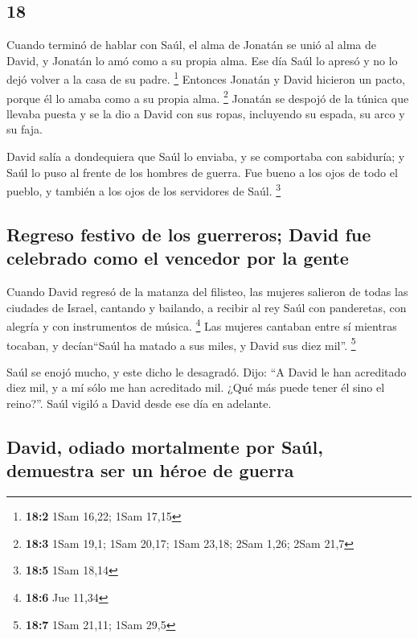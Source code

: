 \begin{paracol}{2}
\hypertarget{section-34}{%
\section{18}\label{section-34}}

 Cuando terminó de hablar con Saúl, el alma de Jonatán se
unió al alma de David, y Jonatán lo amó como a su propia alma.
 Ese día Saúl lo apresó y no lo dejó volver a la casa de
su padre. \footnote{\textbf{18:2} 1Sam 16,22; 1Sam 17,15} 
Entonces Jonatán y David hicieron un pacto, porque él lo amaba como a su
propia alma. \footnote{\textbf{18:3} 1Sam 19,1; 1Sam 20,17; 1Sam 23,18;
  2Sam 1,26; 2Sam 21,7}  Jonatán se despojó de la túnica
que llevaba puesta y se la dio a David con sus ropas, incluyendo su
espada, su arco y su faja.

 David salía a dondequiera que Saúl lo enviaba, y se
comportaba con sabiduría; y Saúl lo puso al frente de los hombres de
guerra. Fue bueno a los ojos de todo el pueblo, y también a los ojos de
los servidores de Saúl. \footnote{\textbf{18:5} 1Sam 18,14}

\hypertarget{regreso-festivo-de-los-guerreros-david-fue-celebrado-como-el-vencedor-por-la-gente}{%
\subsection{Regreso festivo de los guerreros; David fue celebrado como
el vencedor por la
gente}\label{regreso-festivo-de-los-guerreros-david-fue-celebrado-como-el-vencedor-por-la-gente}}

 Cuando David regresó de la matanza del filisteo, las
mujeres salieron de todas las ciudades de Israel, cantando y bailando, a
recibir al rey Saúl con panderetas, con alegría y con instrumentos de
música. \footnote{\textbf{18:6} Jue 11,34}  Las mujeres
cantaban entre sí mientras tocaban, y decían``Saúl ha matado a sus
miles, y David sus diez mil''. \footnote{\textbf{18:7} 1Sam 21,11; 1Sam
  29,5}

 Saúl se enojó mucho, y este dicho le desagradó. Dijo: ``A
David le han acreditado diez mil, y a mí sólo me han acreditado mil.
¿Qué más puede tener él sino el reino?''.  Saúl vigiló a
David desde ese día en adelante.

\hypertarget{david-odiado-mortalmente-por-sauxfal-demuestra-ser-un-huxe9roe-de-guerra}{%
\subsection{David, odiado mortalmente por Saúl, demuestra ser un héroe
de
guerra}\label{david-odiado-mortalmente-por-sauxfal-demuestra-ser-un-huxe9roe-de-guerra}}


\end{paracol}
